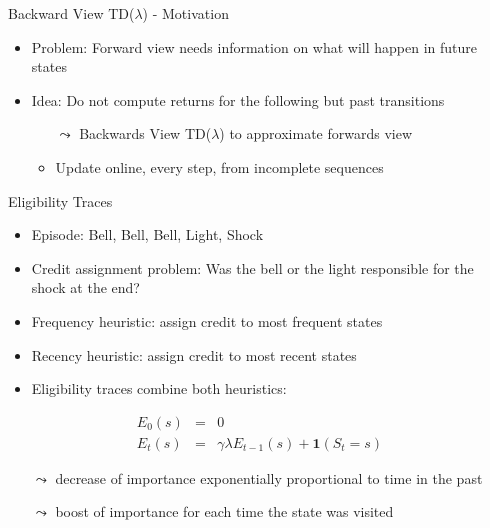 \documentclass[aspectratio=169]{../latex_main/tntbeamer}  %
\begin{document}
\begin{frame}[c]{Backward View TD($\lambda$) - Motivation}
	
	\begin{itemize}
		\item Problem: Forward view needs information on what will happen in future states
            \item Idea: Do not compute returns for the following but past transitions 
            \begin{itemize}
                \item[$\leadsto$] Backwards View TD($\lambda$) to approximate forwards view
                \item Update online, every step, from incomplete sequences
            \end{itemize}
	\end{itemize}	
	
\end{frame}
\begin{frame}[c]{Eligibility Traces}
	
	\begin{itemize}
		\item Episode: Bell, Bell, Bell, Light, Shock
		\item Credit assignment problem: Was the bell or the light responsible for the shock at the end?
		\pause
		\item Frequency heuristic: assign credit to most frequent states
		\item Recency heuristic: assign credit to most recent states
		\item Eligibility traces combine both heuristics:
	\end{itemize}	

\begin{eqnarray}
E_0(s) &=& 0 \nonumber\\
E_t(s) &=& \gamma \lambda E_{t-1}(s) + \mathbf{1}(S_t=s) \nonumber
\end{eqnarray}

\begin{itemize}
	\item[$\leadsto$] decrease of importance exponentially proportional to time in the past
	\item[$\leadsto$] boost of importance for each time the state was visited
\end{itemize}
	
\end{frame}
\end{document}
